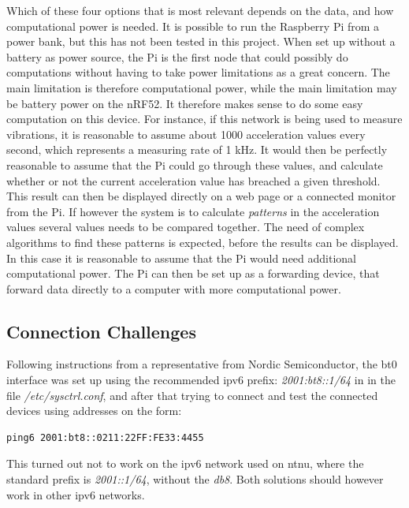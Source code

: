\noindent Which of these four options that is most relevant depends on the data, and how computational power is needed. It is possible to run the Raspberry Pi from a power bank, but this has not been tested in this project. When set up without a battery as power source, the Pi is the first node that could possibly do computations without having to take power limitations as a great concern. The main limitation is therefore computational power, while the main limitation may be battery power on the nRF52. It therefore makes sense to do some easy computation on this device. For instance, if this network is being used to measure vibrations, it is reasonable to assume about 1000 acceleration values every second, which represents a measuring rate of 1 kHz. It would then be perfectly reasonable to assume that the Pi could go through these values, and calculate whether or not the current acceleration value has breached a given threshold. This result can then be displayed directly on a web page or a connected monitor from the Pi. If however the system is to calculate \textit{patterns} in the acceleration values several values needs to be compared together. The need of complex algorithms to find these patterns is expected, before the results can be displayed. In this case it is reasonable to assume that the Pi would need additional computational power. The Pi can then be set up as a forwarding device, that forward data directly to a computer with more computational power. 

\subsection{Connection Challenges}

\noindent Following instructions from a representative from Nordic Semiconductor, the bt0 interface was set up using the recommended \gls{ipv6} prefix: \textit{2001:bt8::1/64} in in the file \textit{/etc/sysctrl.conf}, and after that trying to connect and test the connected devices using addresses on the form: 

\begin{verbatim}
ping6 2001:bt8::0211:22FF:FE33:4455
\end{verbatim}

\noindent This turned out not to work on the \gls{ipv6} network used on \gls{ntnu}, where the standard prefix is \textit{2001::1/64}, without the \textit{db8}. Both solutions should however work in other \gls{ipv6} networks. 





